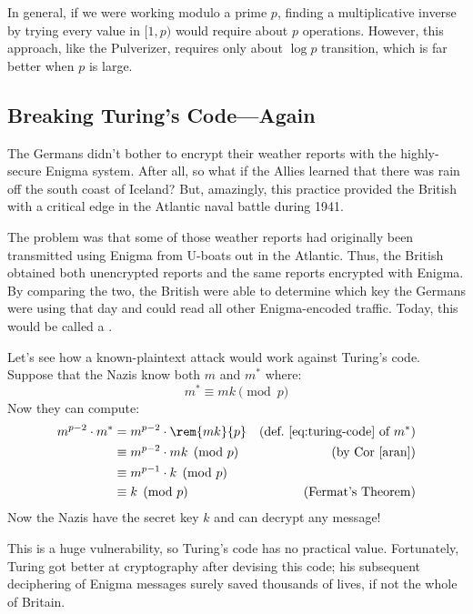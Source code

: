 In general, if we were working modulo a prime $p$, finding a
multiplicative inverse by trying every value in $[1, p)$ would require
  about $p$ operations.  However, this approach, like the Pulverizer,
  requires only about $\log p$ transition, which is far better when
  $p$ is large.

\subsection{Breaking Turing's Code---Again}

The Germans didn't bother to encrypt their weather reports with the
highly-secure Enigma system.  After all, so what if the Allies learned
that there was rain off the south coast of Iceland?  But, amazingly, this
practice provided the British with a critical edge in the Atlantic naval
battle during 1941.

The problem was that some of those weather reports had originally been
transmitted using Enigma from U-boats out in the Atlantic.  Thus, the
British obtained both unencrypted reports and the same reports
encrypted with Enigma.  By comparing the two, the British were able to
determine which key the Germans were using that day and could read all
other Enigma-encoded traffic.  Today, this would be called a
.

Let's see how a known-plaintext attack would work against Turing's
code.  Suppose that the Nazis know both $m$ and $m^*$ where:
%
\[
m^* \equiv mk \pmod{p}
\]
%
Now they can compute:
%
\begin{align*}
m^{p-2} \cdot m^*
  & = m^{p-2} \cdot \rem{mk}{p}
                & \text{(def.~\eqref{eq:turing-code} of $m^*$)}\\
  & \equiv m^{p-2} \cdot mk \pmod{p} & \text{(by Cor~\ref{aran})}\\
  & \equiv m^{p-1} \cdot k \pmod{p}\\ %
  & \equiv k \pmod{p} & \text{(Fermat's Theorem)}
\end{align*}
%
Now the Nazis have the secret key $k$ and can decrypt any message!

This is a huge vulnerability, so Turing's code has no practical value.
Fortunately, Turing got better at cryptography after devising this
code; his subsequent deciphering of Enigma messages surely saved
thousands of lives, if not the whole of Britain.


